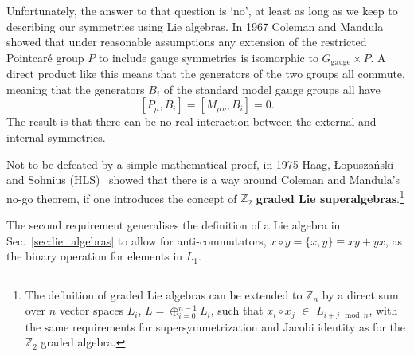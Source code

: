 \documentclass[notes.tex]{subfiles}
\begin{document}
Unfortunately, the answer to that question is `no', at least as long as we keep to describing our symmetries using Lie algebras. In 1967 Coleman and Mandula~\cite{Coleman:1967ad} showed that under reasonable assumptions any extension of the restricted Pointcaré group $P$ to include gauge symmetries is isomorphic to $G_\text{gauge}\times P$. A direct product like this means that the generators of the two groups all commute, meaning that the generators $B_i$ of the standard model gauge groups all have
\[[P_\mu, B_i] = [M_\mu{}_\nu, B_i] = 0.\]
The result is that there can be no real interaction between the external and internal symmetries.

Not to be defeated by a simple mathematical proof, in 1975 Haag, \L opusza\'{n}ski and Sohnius (HLS)~\cite{Haag:1974qh} showed that there is a way around Coleman and Mandula's no-go theorem, if one introduces the concept of $\mathbb{Z}_2$ {\bf graded Lie superalgebras}.\footnote{The definition of graded Lie algebras can be extended to $\mathbb{Z}_n$ by a direct sum over $n$ vector spaces $L_i$, $L = \oplus_{i=0}^{n-1} L_i$, such that $x_i\circ x_j$ $\in$ $L_{i+j\mod{n}}$, with the same requirements for supersymmetrization and Jacobi identity as for the $\mathbb{Z}_2$ graded algebra.}

The second requirement  generalises the definition of a Lie algebra in Sec.~\ref{sec:lie_algebras} to allow for anti-commutators, $x\circ y = \{x,y\}\equiv xy+yx$, as the binary operation for elements in  $L_1$. 
\end{document}
